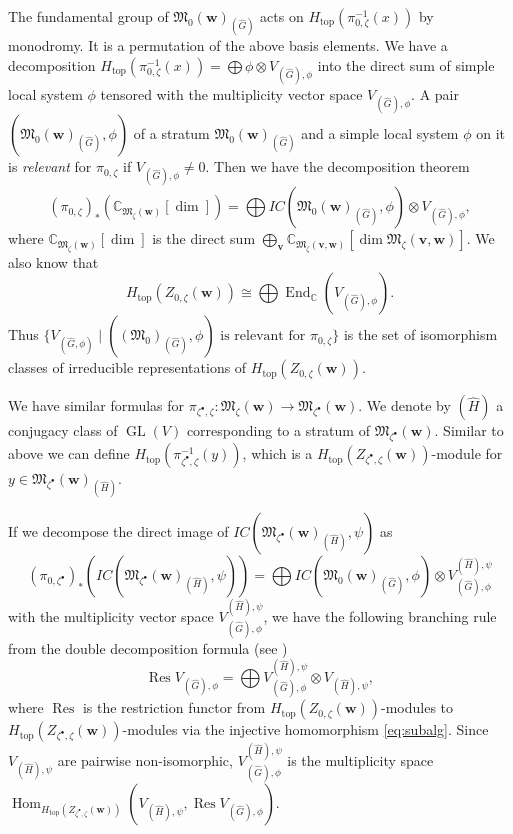 \documentclass[pdftex]{sigma}
\theoremstyle{definition}
\numberwithin{equation}{section}
\newcommand{\C}{{\mathbb C}}
\newcommand{\GL}{\operatorname{GL}}
\newcommand{\End}{\operatorname{End}}
\newcommand{\Hom}{\operatorname{Hom}}
\newcommand{\M}{{\mathfrak M}} %
\newcommand{\bv}{{\mathbf v}} %
\newcommand{\bw}{{\mathbf w}} %
\newcommand{\topdeg}{{\operatorname{top}}} %
\newcommand{\Res}{\operatorname{Res}}
\begin{document}
The fundamental group of $\M_0(\bw)_{(\widehat G)}$ acts on
$H_\topdeg(\pi_{0,\zeta}^{-1}(x))$ by monodromy. It is a permutation
of the above basis elements. We have a decomposition
\(
  H_\topdeg(\pi_{0,\zeta}^{-1}(x)) = \bigoplus \phi\otimes V_{(\widehat{G}),\phi}
\)
into the direct sum of simple local system $\phi$ tensored with the
multiplicity vector space $V_{(\widehat G),\phi}$.
%
A pair $(\M_0(\bw)_{(\widehat G)},\phi)$ of a stratum
$\M_0(\bw)_{(\widehat G)}$ and a simple local system $\phi$ on it is
{\it relevant\/} for $\pi_{0,\zeta}$ if $V_{(\widehat G),\phi}\neq 0$.
%
Then we have the decomposition theorem
\begin{equation*}
  (\pi_{0,\zeta})_*(\C_{\M_\zeta(\bw)}[\dim])
  = \bigoplus IC(\M_0(\bw)_{(\widehat G)},\phi) \otimes V_{(\widehat
    G),\phi},
\end{equation*}
where $\C_{\M_\zeta(\bw)}[\dim]$ is the direct sum
$\bigoplus_\bv \C_{\M_\zeta(\bv,\bw)}[\dim \M_\zeta(\bv,\bw)]$.
%
We also know \cite[8.9.8]{CG} that
\begin{equation}\label{eq:convalg}
  H_{\topdeg}(Z_{0,\zeta}(\bw)) \cong \bigoplus \End_\C(V_{(\widehat G),\phi}).
\end{equation}
Thus $\{ V_{(\widehat G,\phi)} \mid \text{$((\M_0)_{(\widehat
    G)},\phi)$ is relevant for $\pi_{0,\zeta}$}\}$ is the set of
isomorphism classes of irreducible representations of
$H_{\topdeg}(Z_{0,\zeta}(\bw))$.

We have similar formulas for $\pi_{\zeta^\bullet,\zeta}\colon
\M_{\zeta}(\bw)\to \M_{\zeta^\bullet}(\bw)$. We denote by $(\widehat H)$
a conjugacy class of $\GL(V)$ corresponding to a stratum of
$\M_{\zeta^\bullet}(\bw)$.
%
Similar to above we can def\/ine
$H_{\topdeg}(\pi_{\zeta^\bullet,\zeta}^{-1}(y))$, which is a
$H_\topdeg(Z_{\zeta^\bullet,\zeta}(\bw))$-module for
$y\in \M_{\zeta^\bullet}(\bw)_{(\widehat H)}$.

If we decompose the direct image of
$IC(\M_{\zeta^\bullet}(\bw)_{(\widehat H)},\psi)$ as
\begin{equation}\label{eq:bullet}
   (\pi_{0,\zeta^\bullet})_*(IC(\M_{\zeta^\bullet}(\bw)_{(\widehat
     H)},\psi))
   = \bigoplus IC(\M_0(\bw)_{(\widehat G)},\phi)\otimes
     V_{(\widehat G),\phi}^{(\widehat H),\psi}
\end{equation}
with the multiplicity vector space $V_{(\widehat G),\phi}^{(\widehat
  H),\psi}$, we have the following branching rule from the double
decomposition formula (see \cite[1.11]{BM})
\begin{equation}\label{eq:branching}
   \Res V_{(\widehat G),\phi} = \bigoplus
   V_{(\widehat G),\phi}^{(\widehat H),\psi} \otimes V_{(\widehat H),\psi},
\end{equation}
where $\Res$ is the restriction functor from
$H_{\topdeg}(Z_{0,\zeta}(\bw))$-modules to
$H_{\topdeg}(Z_{\zeta^\bullet,\zeta}(\bw))$-modules via the injective
homomorphism \eqref{eq:subalg}. Since $V_{(\widehat H),\psi}$ are
pairwise non-isomorphic, $V_{(\widehat G),\phi}^{(\widehat H),\psi}$
is the multiplicity space
\(
   \Hom_{H_{\topdeg}(Z_{\zeta^\bullet,\zeta}(\bw))}
   (V_{(\widehat H),\psi}, \Res V_{(\widehat G),\phi}).
\)
\end{document}
